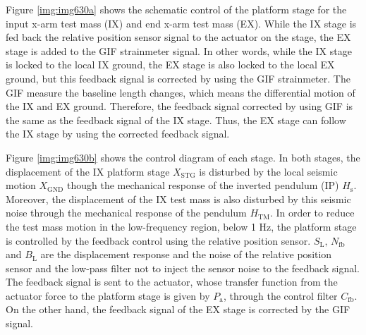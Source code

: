 Figure \ref{img:img630a} shows the schematic control of the platform stage for the input x-arm test mass (IX) and end x-arm test mass (EX). While the IX stage is fed back the relative position sensor signal to the actuator on the stage, the EX stage is added to the GIF strainmeter signal. In other words, while the IX stage is locked to the local IX ground, the EX stage is also locked to the local EX ground, but this feedback signal is corrected by using the GIF strainmeter. The GIF measure the baseline length changes, which means the differential motion of the IX and EX ground. Therefore, the feedback signal corrected by using GIF is the same as the feedback signal of the IX stage. Thus, the EX stage can follow the IX stage by using the corrected feedback signal.

Figure \ref{img:img630b} shows the control diagram of each stage. In both stages, the displacement of the IX platform stage $X_{\mathrm{STG}}$ is disturbed by the local seismic motion $X_{\mathrm{GND}}$ though the mechanical response of the inverted pendulum (IP) $H_{\mathrm{s}}$. Moreover, the displacement of the IX test mass is also disturbed by this seismic noise through the mechanical response of the pendulum $H_{\mathrm{TM}}$. In order to reduce the test mass motion in the low-frequency region, below 1 Hz, the platform stage is controlled by the feedback control using the relative position sensor. $S_{\mathrm{L}},\, N_{\mathrm{fb}}$ and $B_{\mathrm{L}}$ are the displacement response and the noise of the relative position sensor and the low-pass filter not to inject the sensor noise to the feedback signal. The feedback signal is sent to the actuator, whose transfer function from the actuator force to the platform stage is given by $P_{\mathrm{a}}$, through the control filter $C_{\mathrm{fb}}$. On the other hand, the feedback signal of the EX stage is corrected by the GIF signal.

